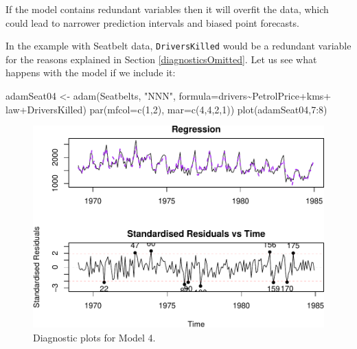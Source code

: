 \documentclass[
]{book}
\newenvironment{Shaded}{\begin{snugshade}}{\end{snugshade}}
\newcommand{\AttributeTok}[1]{\textcolor[rgb]{0.77,0.63,0.00}{#1}}
\newcommand{\DecValTok}[1]{\textcolor[rgb]{0.00,0.00,0.81}{#1}}
\newcommand{\FunctionTok}[1]{\textcolor[rgb]{0.00,0.00,0.00}{#1}}
\newcommand{\NormalTok}[1]{#1}
\newcommand{\OtherTok}[1]{\textcolor[rgb]{0.56,0.35,0.01}{#1}}
\newcommand{\SpecialCharTok}[1]{\textcolor[rgb]{0.00,0.00,0.00}{#1}}
\newcommand{\StringTok}[1]{\textcolor[rgb]{0.31,0.60,0.02}{#1}}
\theoremstyle{definition}
\theoremstyle{definition}
\theoremstyle{definition}
\theoremstyle{definition}
\theoremstyle{remark}
\begin{document}
If the model contains redundant variables then it will overfit the data, which could lead to narrower prediction intervals and biased point forecasts.

In the example with Seatbelt data, \texttt{DriversKilled} would be a redundant variable for the reasons explained in Section \ref{diagnosticsOmitted}. Let us see what happens with the model if we include it:

\begin{Shaded}
\begin{Highlighting}[]
\NormalTok{adamSeat04 }\OtherTok{\textless{}{-}} \FunctionTok{adam}\NormalTok{(Seatbelts, }\StringTok{"NNN"}\NormalTok{, }
                   \AttributeTok{formula=}\NormalTok{drivers}\SpecialCharTok{\textasciitilde{}}\NormalTok{PetrolPrice}\SpecialCharTok{+}\NormalTok{kms}\SpecialCharTok{+}
\NormalTok{                     law}\SpecialCharTok{+}\NormalTok{DriversKilled)}
\FunctionTok{par}\NormalTok{(}\AttributeTok{mfcol=}\FunctionTok{c}\NormalTok{(}\DecValTok{1}\NormalTok{,}\DecValTok{2}\NormalTok{), }\AttributeTok{mar=}\FunctionTok{c}\NormalTok{(}\DecValTok{4}\NormalTok{,}\DecValTok{4}\NormalTok{,}\DecValTok{2}\NormalTok{,}\DecValTok{1}\NormalTok{))}
\FunctionTok{plot}\NormalTok{(adamSeat04,}\DecValTok{7}\SpecialCharTok{:}\DecValTok{8}\NormalTok{)}
\end{Highlighting}
\end{Shaded}

\begin{figure}
\centering
\includegraphics{Svetunkov--2022----ADAM_files/figure-latex/adamSeat04-1.pdf}
\caption{\label{fig:adamSeat04}Diagnostic plots for Model 4.}
\end{figure}
\end{document}
